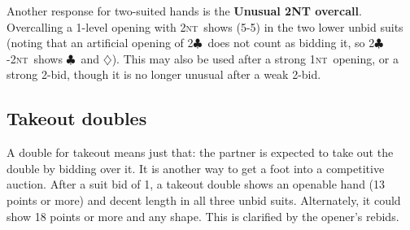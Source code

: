 \documentclass[11pt]{article}
\def\C{$\clubsuit$}
\def\D{$\diamondsuit$}
\def\NT{\textsc{nt}}
\begin{document}
Another response for two-suited hands is the \textbf{Unusual 2NT overcall}.
Overcalling a 1-level opening with 2\NT\ shows (5-5) in the two lower unbid
suits (noting that an artificial opening of 2\C\ does not count as bidding
it, so 2\C-2\NT\ shows \C\ and \D).  This may also be used after a strong 
1\NT\ opening, or a strong 2-bid, though it is no longer unusual after a
weak 2-bid.

\subsection{Takeout doubles}

A double for takeout means just that: the partner is expected to
take out the double by bidding over it.  It is another way to get
a foot into a competitive auction.  After a suit bid of 1, a takeout
double shows an openable hand (13 points or more) and decent length
in all three unbid suits.  Alternately, it could show 18 points or more
and any shape.  This is clarified by the opener's rebids.
\end{document}
